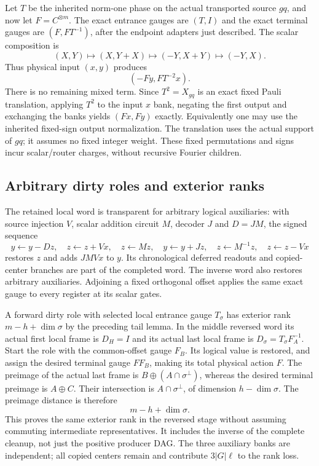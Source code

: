 Let $T$ be the inherited norm-one phase on the actual transported source
$gq$, and now let $F=C^{\otimes m}$.
The exact entrance gauges are $(T,I)$ and the exact terminal gauges are
$(F,FT^{-1})$, after the endpoint adapters just described.
The scalar composition is
\[
 (X,Y)\mapsto(X,Y+X)\mapsto(-Y,X+Y)\mapsto(-Y,X).
\]
Thus physical input $(x,y)$ produces
\[
 (-Fy,FT^{-2}x).
\]
There is no remaining mixed term. Since $T^2=X_{gq}$ is an exact fixed
Pauli translation, applying $T^2$ to the input $x$ bank, negating the
first output and exchanging the banks yields $(Fx,Fy)$ exactly.
Equivalently one may use the inherited fixed-sign output normalization.
The translation uses the actual support of $gq$; it assumes no fixed
integer weight. These fixed permutations and signs incur scalar/router
charges, without recursive Fourier children.

\subsection{Arbitrary dirty roles and exterior ranks}
The retained local word is transparent for arbitrary logical auxiliaries:
with source injection $V$, scalar addition circuit $M$, decoder $J$ and
$D=JM$, the signed sequence
\[
 y\gets y-Dz,\quad z\gets z+Vx,\quad z\gets Mz,\quad
 y\gets y+Jz,\quad z\gets M^{-1}z,\quad z\gets z-Vx
\]
restores $z$ and adds $JMVx$ to $y$. Its chronological deferred readouts
and copied-center branches are part of the completed word. The inverse
word also restores arbitrary auxiliaries. Adjoining a fixed orthogonal
offset applies the same exact gauge to every register at its scalar gates.

A forward dirty role with selected local entrance gauge $T_\sigma$
has exterior rank $m-h+\dim\sigma$ by the preceding tail lemma.
In the middle reversed word its actual first local frame is $D_H=I$
and its actual last local frame is $D_\sigma=T_\sigma F_A^{-1}$.
Start the role with the common-offset gauge $F_B$. Its logical value is
restored, and assign the desired terminal gauge $F F_B$, making its total
physical action $F$. The preimage of the actual last frame is
$B\oplus(A\cap\sigma^\perp)$, whereas the desired terminal preimage is
$A\oplus C$. Their intersection is $A\cap\sigma^\perp$, of dimension
$h-\dim\sigma$. The preimage distance is therefore
\[
 m-h+\dim\sigma.
\]
This proves the same exterior rank in the reversed stage without assuming
commuting intermediate representatives. It includes the inverse of the
complete cleanup, not just the positive producer DAG. The three auxiliary
banks are independent; all copied centers remain and contribute
$3|G|\ell$ to the rank loss.

